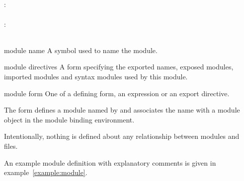 \begin{optDefinition}
{\begin{syntax}
    \>   \\
    \>   \\
    \>   \\
    \>   \\
    : \\
    \>   \\
    : \\
    \>   \\
\end{syntax}}
%
\begin{arguments}
    \item[module name] A symbol used to name the module.
    \item[module directives] A form specifying the exported names, exposed
    modules, imported modules and syntax modules used by this module.
    \item[module form] One of a defining form, an expression or an export
    directive.
\end{arguments}
%
\remarks%
The  form defines a module named by 
and associates the name  with a module object in the
module binding environment.
\begin{note}
    Intentionally, nothing is defined about any relationship between modules and
    files.
\end{note}
%
\examples
An example module definition with explanatory comments is given in
example~\ref{example:module}.
%
\end{optDefinition}
%
\label{directives}
%
